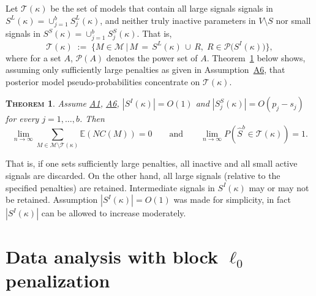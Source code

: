 \documentclass[bj,authoryear]{imsart}
\theoremstyle{plain}
\newtheorem{thm}{\textsc{Theorem}}[section]
\newcommand{\E}{\mathbb{E}}
\newcommand{\M}{\mathcal{M}}
\newcommand{\T}{\mathcal{T}}
\begin{document}
Let $\T(\kappa)$ be the set of models that contain all large signals signals in $S^{L}(\kappa)=\cup_{j=1}^b S_j^{L}(\kappa)$, and neither truly inactive parameters in $V\setminus S$ nor small signals in $S^S(\kappa)=\cup_{j=1}^b S^{S}_j(\kappa)$. That is,
\begin{equation} \label{eq:Tkappa}
   \T(\kappa) \;:=\;\Big\{M \in \M \,\big|\, M\,=\, S^L(\kappa)\,\cup\,R,\; R\in \mathcal{P}\big(S^{I}(\kappa)\big)  \Big\},
\end{equation}
where for a set $A$, $ \mathcal{P}(A)$ denotes the power set of $A$.
Theorem~\ref{thm:convtoT} below shows,
assuming only sufficiently large penalties as given in Assumption~\hyperlink{lab:A6}{A6},  that posterior model pseudo-probabilities concentrate on $\T(\kappa)$.
\begin{thm}\label{thm:convtoT}
    Assume \hyperlink{lab:A1}{A1}, \hyperlink{lab:A6}{A6}, $|S^{I}(\kappa)|=O(1)$ and $|S^{S}_j(\kappa)|=O(p_j-s_j)$ for every $j=1,\ldots,b$. Then
    $$\lim_{n \to \infty} \sum_{M \in \M\setminus \T(\kappa)} \E\left(NC(M)\right)= 0 \qquad \mbox{and} \qquad
    \lim_{n \to \infty} P(\hat{S}^b \in \T(\kappa))= 1.$$
\end{thm}
That is, if one sets
sufficiently large penalties, all inactive and all small active signals are discarded. On the other hand, all large signals (relative to the specified penalties) are retained. Intermediate signals in $S^{I}(\kappa)$ may or may not be retained. Assumption $|S^{I}(\kappa)|=O(1)$ was made for simplicity, in fact $|S^{I}(\kappa)|$ can be allowed to increase moderately. 

\section{Data analysis with block $\ell_0$ penalization}\label{sec:informed_l0}
\end{document}

